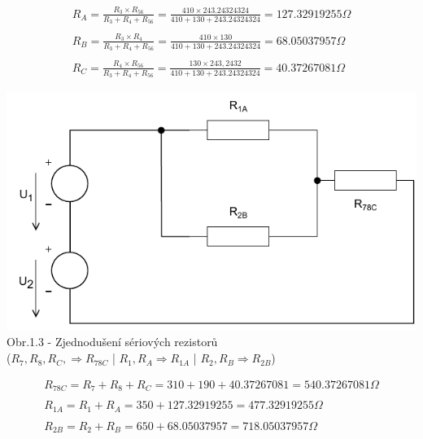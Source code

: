 \begin{gather*}
R_A = \frac{R_3 \times R_{56}}{R_3 + R_4 + R_{56}} =
\frac{410 \times 243.24324324}{410 + 130 + 243.24324324}=
127.32919255\Omega \\\\
R_B = \frac{R_3 \times R_4}{R_3 + R_4 + R_{56}} =
\frac{410 \times 130}{410 + 130 + 243.24324324} =
68.05037957 \Omega \\\\
R_C = \frac{R_4 \times R_{56}}{R_3 + R_4 + R_{56}} =
\frac{130 \times 243,2432}{410 + 130 + 243.24324324} =
40.37267081 \Omega
\end{gather*}

\begin{center}
\includegraphics[scale=0.8,keepaspectratio]{fig/solutions/01-sol/01-step3.pdf} \\
Obr.1.3 - Zjednodušení sériových rezistorů \\
($R_7, R_8, R_C, \Rightarrow R_{78C}$ | $R_1, R_A \Rightarrow R_{1A}$ | $R_2, R_B \Rightarrow R_{2B}$)
\end{center}

\begin{gather*}
R_{78C} = R_7 + R_8 + R_C =
310 + 190 + 40.37267081 =
540.37267081 \Omega
\\\\
R_{1A} = R_1 + R_A =
350 + 127.32919255 =
477.32919255 \Omega
\\\\
R_{2B} = R_2 + R_B =
650 + 68.05037957 =
718.05037957 \Omega
\end{gather*}

\newpage

